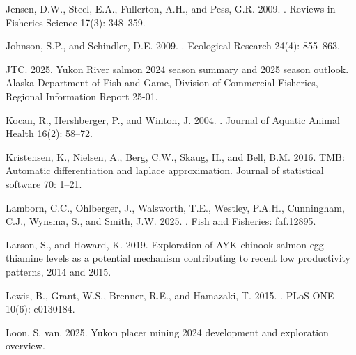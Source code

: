 \documentclass[11pt]{book}
\begin{document}
\begin{CSLReferences}{1}{0}
%
Jensen, D.W., Steel, E.A., Fullerton, A.H., and Pess, G.R. 2009. . Reviews in Fisheries Science 17(3): 348--359.

%
Johnson, S.P., and Schindler, D.E. 2009. . Ecological Research 24(4): 855--863.

%
JTC. 2025. {Yukon River salmon 2024 season summary and 2025 season outlook}. Alaska Department of Fish and Game, Division of Commercial Fisheries, Regional Information Report 25-01.

%
Kocan, R., Hershberger, P., and Winton, J. 2004. . Journal of Aquatic Animal Health 16(2): 58--72.

%
Kristensen, K., Nielsen, A., Berg, C.W., Skaug, H., and Bell, B.M. 2016. TMB: Automatic differentiation and laplace approximation. Journal of statistical software 70: 1--21.

%
Lamborn, C.C., Ohlberger, J., Walsworth, T.E., Westley, P.A.H., Cunningham, C.J., Wynsma, S., and Smith, J.W. 2025. . Fish and Fisheries: faf.12895.

%
Larson, S., and Howard, K. 2019. Exploration of AYK chinook salmon egg thiamine levels as a potential mechanism contributing to recent low productivity patterns, 2014 and 2015.

%
Lewis, B., Grant, W.S., Brenner, R.E., and Hamazaki, T. 2015. . {PLoS} {ONE} 10(6): e0130184.

%
Loon, S. van. 2025. Yukon placer mining 2024 development and exploration overview.


\end{CSLReferences}
\end{document}
